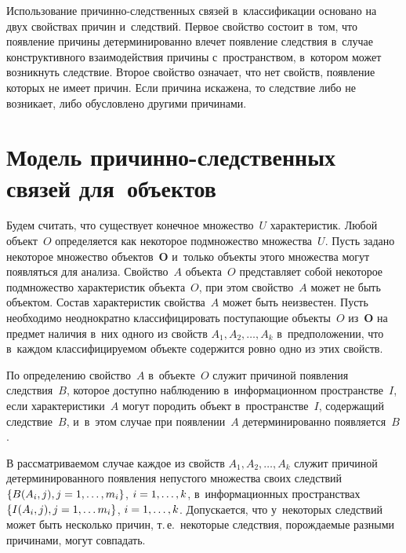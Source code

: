 \begin{multicols}{2}
Использование при\-чин\-но-след\-ст\-вен\-ных связей в~классификации 
основано на двух свойствах причин и~следствий. Пер\-вое свойство со\-сто\-ит в~том, 
что появление причины детерминированно влечет появление следствия в~случае 
конструктивного взаимодействия причины с~пространством, в~котором может 
возникнуть следствие. Второе свойство означает, что нет свойств, появление 
которых не имеет причин. Если причина искажена, то следствие либо не 
возникает, либо обуслов\-ле\-но другими при\-чи\-нами. 

\vspace*{-3pt}
  
  \section{Модель причинно-следственных связей для~объектов}
  
  \vspace*{-3pt}
  
  Будем считать, что существует конечное множество~$U$ характеристик. 
Любой объект~$O$ определяется как некоторое подмножество множества~$U$. 
Пусть задано некоторое множество объектов~$\bm{O}$ и~только объекты этого 
множества могут появляться для анализа. Свойство~$A$ объекта~$O$ 
пред\-став\-ля\-ет собой некоторое подмножество характеристик объекта~$O$, при 
этом свойство~$A$ может не быть объектом. Со\-став характеристик свойства~$A$ 
может быть неизвестен. Пусть необходимо неоднократно классифицировать 
по\-сту\-па\-ющие объекты~$O$ из~$\bm{O}$ на предмет наличия в~них одного из 
свойств $A_1, A_2, \ldots , A_k$ в~предположении, что в~каж\-дом 
клас\-си\-фи\-ци\-ру\-емом объекте содержится ров\-но одно из этих свойств. 
  
  По определению свойство~$A$ в~объекте~$O$ служит причиной появления 
следствия~$B$, которое до\-ступ\-но наблюдению в~информационном 
пространстве~$I$, если характеристики~$A$ могут породить \mbox{объект} 
в~пространстве~$I$, со\-дер\-жа\-щий следствие~$B$, и~в~этом случае при 
появлении~$A$ детерминированно появляется~$B$. 
  
  В рассматриваемом случае каж\-дое из свойств $A_1, A_2,\ldots , A_k$ служит 
причиной детерминированного появления не\-пус\-то\-го множества своих следствий 
  $\{ B(A_i, j), j\hm= 1,\ldots , m_i\}$, $i\hm= 1,\ldots , k$, в~информационных 
пространствах $\{ I(A_i, j), j\hm= 1,\ldots m_i\}$, $i\hm= 1,\ldots , k$. Допускается, 
что у~некоторых следствий может быть несколько причин, т.\,е.\ некоторые 
следствия, по\-рож\-да\-емые разными причинами, могут совпадать. 


\end{multicols}
